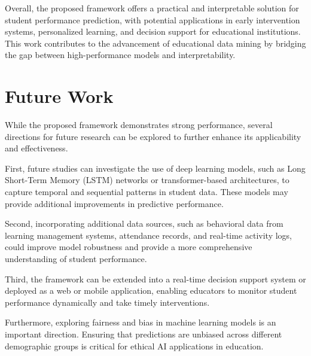 \documentclass[conference]{IEEEtran}
\begin{document}
Overall, the proposed framework offers a practical and interpretable solution for student performance prediction, with potential applications in early intervention systems, personalized learning, and decision support for educational institutions. This work contributes to the advancement of educational data mining by bridging the gap between high-performance models and interpretability. 

\section{Future Work}

While the proposed framework demonstrates strong performance, several directions for future research can be explored to further enhance its applicability and effectiveness. 

First, future studies can investigate the use of deep learning models, such as Long Short-Term Memory (LSTM) networks or transformer-based architectures, to capture temporal and sequential patterns in student data. These models may provide additional improvements in predictive performance. 

Second, incorporating additional data sources, such as behavioral data from learning management systems, attendance records, and real-time activity logs, could improve model robustness and provide a more comprehensive understanding of student performance. 

Third, the framework can be extended into a real-time decision support system or deployed as a web or mobile application, enabling educators to monitor student performance dynamically and take timely interventions. 

Furthermore, exploring fairness and bias in machine learning models is an important direction. Ensuring that predictions are unbiased across different demographic groups is critical for ethical AI applications in education. 

\newpage
\end{document}
